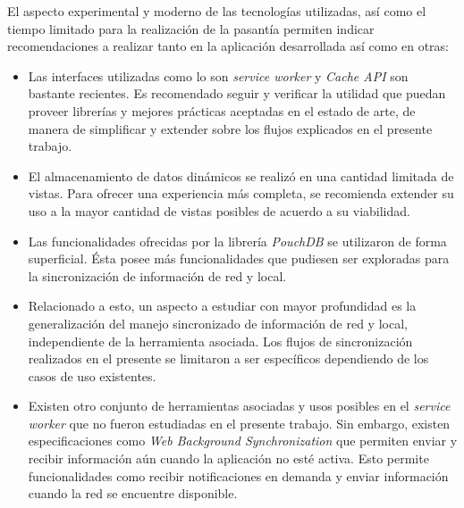 El aspecto experimental y moderno de las tecnologías utilizadas, así como el tiempo limitado para la realización de la pasantía permiten indicar recomendaciones a realizar tanto en la aplicación desarrollada así como en otras:

\begin{itemize}

  \item Las interfaces utilizadas como lo son \textit{service worker} y \textit{Cache API} son bastante recientes. Es recomendado seguir y verificar la utilidad que puedan proveer librerías y mejores prácticas aceptadas en el estado de arte, de manera de simplificar y extender sobre los flujos explicados en el presente trabajo.

  \item El almacenamiento de datos dinámicos se realizó en una cantidad limitada de vistas. Para ofrecer una experiencia más completa, se recomienda extender su uso a la mayor cantidad de vistas posibles de acuerdo a su viabilidad.

  \item Las funcionalidades ofrecidas por la librería \textit{PouchDB} se utilizaron de forma superficial. Ésta posee más funcionalidades que pudiesen ser exploradas para la sincronización de información de red y local.

  \item Relacionado a esto, un aspecto a estudiar con mayor profundidad es la generalización del manejo sincronizado de información de red y local, independiente de la herramienta asociada. Los flujos de sincronización realizados en el presente se limitaron a ser específicos dependiendo de los casos de uso existentes.

  \item Existen otro conjunto de herramientas asociadas y usos posibles en el \textit{service worker} que no fueron estudiadas en el presente trabajo. Sin embargo, existen especificaciones como \textit{Web Background Synchronization} que permiten enviar y recibir información aún cuando la aplicación no esté activa. Esto permite funcionalidades como recibir notificaciones en demanda y enviar información cuando la red se encuentre disponible.

\end{itemize}

\newpage
